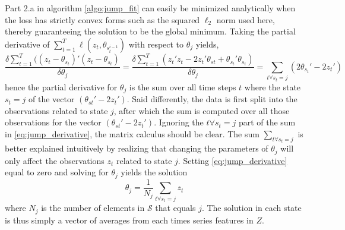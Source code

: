 Part 2.a in algorithm \ref{algo:jump_fit} can easily be minimized analytically when the loss has strictly convex forms such as the squared $\ell_2$ norm used here, thereby guaranteeing the solution to be the global minimum. Taking the partial derivative of $\sum_{t=1}^T \ell(z_t, \theta_{s_t^{i-1}})$ with respect to $\theta_j$ yields,
\begin{equation}
   \frac{\delta \sum_{t=1}^{T} ((z_t-\theta_{s_t})'(z_t-\theta_{s_t}) }{\delta \theta_j}
   = \frac{\delta \sum_{t=1}^T (z_t'z_t - 2z_t'\theta_{st}+ \theta_{s_t}'\theta_{s_t} )}{\delta  \theta_j}
   = \sum_{t\forall s_t=j} ( 2\theta_{s_t}' - 2z_t' )
\label{eq:jump_derivative}
\end{equation}
hence the partial derivative for $\theta_j$ is the sum over all time steps $t$ where the state $s_t=j$ of the vector $(\theta_{st}'-2z_t')$. Said differently, the data is first split into the observations related to state $j$, after which the sum is computed over all those observations for the vector $(\theta_{st}'-2z_t')$. Ignoring the $t\forall s_t=j$ part of the sum in \cref{eq:jump_derivative}, the matrix calculus should be clear. The sum $\sum_{t\forall s_t=j}$ is better explained intuitively by realizing that changing the parameters of $\theta_j$ will only affect the observations $z_t$ related to state $j$. Setting \cref{eq:jump_derivative} equal to zero and solving for $\theta_j$ yields the solution
\begin{equation}
    \theta_j = \frac{1}{N_j} \sum_{t\forall s_t=j} z_t     
\end{equation}
where $N_j$ is the number of elements in $\mathcal{S}$ that equals $j$. The solution in each state is thus simply a vector of averages from each times series features in $Z$.

